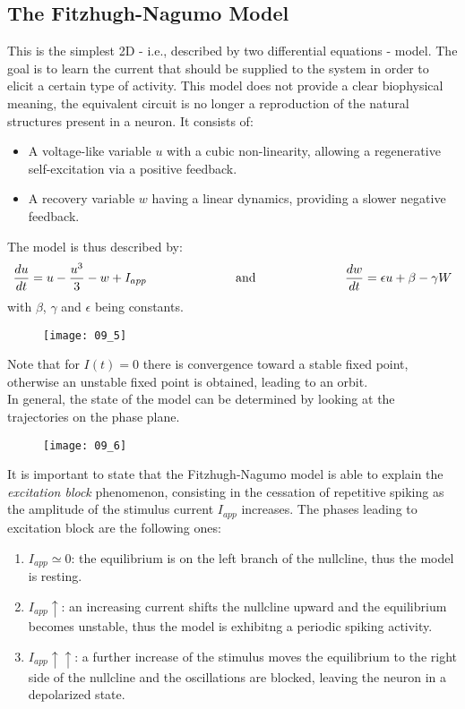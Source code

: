 \subsection{The Fitzhugh-Nagumo Model}
This is the simplest 2D - i.e., described by two differential equations - model. The goal is to learn the
current that should be supplied to the system in order to elicit a certain type of activity. This model
does not provide a clear biophysical meaning, the equivalent circuit is no longer a reproduction of
the natural structures present in a neuron. It consists of:
\begin{itemize}
    \item A voltage-like variable \(u\) with a cubic non-linearity, allowing a regenerative self-excitation
          via a positive feedback.
    \item A recovery variable \(w\) having a linear dynamics, providing a slower negative feedback.
\end{itemize}
The model is thus described by:
\begin{equation*}
    \frac{du}{dt}=u-\frac{u^{3}}{3}-w+I_{app}
    \hspace{2.5cm}
    \text{and}
    \hspace{2.5cm}
    \frac{dw}{dt}=\epsilon{u+\beta-\gamma{W}}
\end{equation*}
with \(\beta\), \(\gamma\) and \(\epsilon\) being constants.
\begin{figure}[H]
    \texttt{[image: 09\_5]}
    \centering
\end{figure}
Note that for \(I(t)=0\) there is convergence toward a stable fixed point, otherwise an unstable
fixed point is obtained, leading to an orbit.\\
In general, the state of the model can be determined by looking at the trajectories on the phase plane.
\begin{figure}[H]
    \texttt{[image: 09\_6]}
    \centering
\end{figure}
It is important to state that the Fitzhugh-Nagumo model is able to explain the \textit{excitation block}
phenomenon, consisting in the cessation of repetitive spiking as the amplitude of the stimulus current
\(I_{app}\) increases. The phases leading to excitation block are the following ones:
\begin{enumerate}
    \item \(I_{app}\simeq{0}\): the equilibrium is on the left branch of the nullcline, thus the
          model is resting.
    \item \(I_{app}\uparrow\): an increasing current shifts the nullcline upward and the equilibrium
          becomes unstable, thus the model is exhibitng a periodic spiking activity.
    \item \(I_{app}\uparrow\uparrow\): a further increase of the stimulus moves the equilibrium to the
          right side of the nullcline and the oscillations are blocked, leaving the neuron in a depolarized state.
\end{enumerate}

